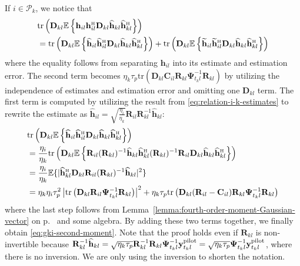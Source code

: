 \documentclass[SIG,biber]{nowfnt}
\newcommand{\vect}[1]{\mathbf{#1}}
\def\tr{\mathrm{tr}}
\def\Htran{\mbox{\tiny $\mathrm{H}$}}
\begin{document}
If $i \in \mathcal{P}_k$, we notice that
	\begingroup
\allowdisplaybreaks
\begin{align} \nonumber
& \tr\left(\vect{D}_{kl}  \mathbb{E} \left\{ \vect{h}_{il}\vect{h}_{il}^{\Htran} \vect{D}_{kl} \widehat{\vect{h}}_{kl} \widehat{\vect{h}}_{kl}^{\Htran} \right\} \right) \\ 
 &=  \tr\left(\vect{D}_{kl}  \mathbb{E} \left\{ \widehat{\vect{h}}_{il} \widehat{\vect{h}}_{il}^{\Htran} \vect{D}_{kl} \widehat{\vect{h}}_{kl} \widehat{\vect{h}}_{kl}^{\Htran} \right\} \right) 
 + \tr\left(\vect{D}_{kl}  \mathbb{E} \left\{ \widetilde{\vect{h}}_{il} \widetilde{\vect{h}}_{il}^{\Htran} \vect{D}_{kl} \widehat{\vect{h}}_{kl} \widehat{\vect{h}}_{kl}^{\Htran} \right\} \right)
\end{align}
 \endgroup
where the equality follows from separating $\vect{h}_{il}$ into its estimate and estimation error. The second term becomes $ \eta_k \tau_p  \tr ( \vect{D}_{kl} \vect{C}_{il} \vect{R}_{kl} \vect{\Psi}_{t_k l}^{-1} \vect{R}_{kl} )$ by utilizing the independence of estimates and estimation error and omitting one $\vect{D}_{kl}$ term. The first term is computed by utilizing the result from \eqref{eq:relation-i-k-estimates} to rewrite the estimate as  $\widehat{\vect{h}}_{il}   =\sqrt{ \frac{\eta_i}{\eta_k} }  \vect{R}_{il}\vect{R}_{kl}^{-1}   \widehat{\vect{h}}_{kl}$: 
\begin{align} \nonumber
&\tr\left(\vect{D}_{kl}  \mathbb{E} \left\{ \widehat{\vect{h}}_{il} \widehat{\vect{h}}_{il}^{\Htran} \vect{D}_{kl} \widehat{\vect{h}}_{kl} \widehat{\vect{h}}_{kl}^{\Htran} \right\} \right)   \\ \nonumber
&= \frac{\eta_i}{\eta_k} \tr\left(\vect{D}_{kl}  \mathbb{E} \left\{ \vect{R}_{il}(\vect{R}_{kl})^{-1} \widehat{\vect{h}}_{kl} \widehat{\vect{h}}_{kl}^{\Htran} (\vect{R}_{kl})^{-1} \vect{R}_{il} \vect{D}_{kl} \widehat{\vect{h}}_{kl} \widehat{\vect{h}}_{kl}^{\Htran} \right\} \right) \\ \nonumber
&= \frac{\eta_i}{\eta_k}  \mathbb{E} \{ |\widehat{\vect{h}}_{kl}^{\Htran} \vect{D}_{kl}   \vect{R}_{il}(\vect{R}_{kl})^{-1} \widehat{\vect{h}}_{kl}|^2 \} \\
&= \eta_k\eta_i\tau_p^{2}  \left|\tr \left(  \vect{D}_{kl} \vect{R}_{il} \vect{\Psi}_{t_k l}^{-1} \vect{R}_{kl}  \right)\right|^2 + \eta_k \tau_p  \tr \left( \vect{D}_{kl} (\vect{R}_{il} - \vect{C}_{il})\vect{R}_{kl} \vect{\Psi}_{t_k l}^{-1} \vect{R}_{kl}\right)
\end{align}
where the last step follows from Lemma~\ref{lemma:fourth-order-moment-Gaussian-vector} on p.~\pageref{lemma:fourth-order-moment-Gaussian-vector} and some algebra. By adding these two terms together, we finally obtain \eqref{eq:gki-second-moment}.
Note that the proof holds even if $\vect{R}_{kl}$ is non-invertible because $\vect{R}_{kl}^{-1}  \widehat{\vect{h}}_{kl} = \sqrt{\eta_k \tau_p} \vect{R}_{kl}^{-1} \vect{R}_{kl} \vect{\Psi}_{t_kl}^{-1} \vect{y}_{t_kl}^{{\rm pilot}} = \sqrt{\eta_k \tau_p} \vect{\Psi}_{t_kl}^{-1} \vect{y}_{t_kl}^{{\rm pilot}}$, where there is no inversion. We are only using the inversion to shorten the notation.
\end{document}
